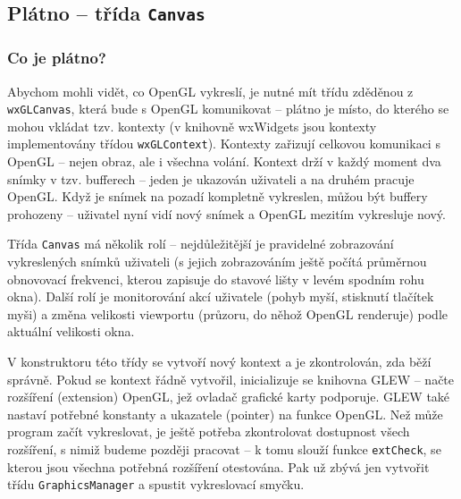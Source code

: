 \documentclass[a4paper, 12pt]{report}
\begin{document}
\subsection{Plátno -- třída \texttt{Canvas}}
\subsubsection{Co je plátno?}
Abychom mohli vidět, co OpenGL vykreslí, je nutné mít třídu zděděnou z \texttt{wxGLCanvas}, která bude s OpenGL komunikovat -- plátno je místo, do kterého se mohou vkládat tzv. kontexty (v knihovně wxWidgets jsou kontexty implementovány třídou \texttt{wxGLContext}). Kontexty zařizují celkovou komunikaci s OpenGL -- nejen obraz, ale i všechna volání. Kontext drží v každý moment dva snímky v tzv. bufferech -- jeden je ukazován uživateli a na druhém pracuje OpenGL. Když je snímek na pozadí kompletně vykreslen, můžou být buffery prohozeny -- uživatel nyní vidí nový snímek a OpenGL mezitím vykresluje nový.

Třída \texttt{Canvas} má několik rolí -- nejdůležitější je pravidelné zobrazování vykreslených snímků uživateli (s jejich zobrazováním ještě počítá průměrnou obnovovací frekvenci, kterou zapisuje do stavové lišty v levém spodním rohu okna). Další rolí je monitorování akcí uživatele (pohyb myší, stisknutí tlačítek myši) a změna velikosti viewportu (průzoru, do něhož OpenGL renderuje) podle aktuální velikosti okna.

V konstruktoru této třídy se vytvoří nový kontext a je zkontrolován, zda běží správně. Pokud se kontext řádně vytvořil, inicializuje se knihovna GLEW -- načte rozšíření (extension) OpenGL, jež ovladač grafické karty podporuje. GLEW také nastaví potřebné konstanty a ukazatele (pointer) na funkce OpenGL. Než může program začít vykreslovat, je ještě potřeba zkontrolovat dostupnost všech rozšíření, s nimiž budeme později pracovat -- k tomu slouží funkce \texttt{extCheck}, se kterou jsou všechna potřebná rozšíření otestována. Pak už zbývá jen vytvořit třídu \texttt{GraphicsManager} a spustit vykreslovací smyčku.
\end{document}
